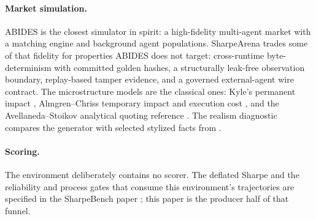 \paragraph{Market simulation.} ABIDES \citep{byrd2020abides} is the closest simulator in spirit: a high-fidelity multi-agent market with a matching engine and background agent populations. SharpeArena trades some of that fidelity for properties ABIDES does not target: cross-runtime byte-determinism with committed golden hashes, a structurally leak-free observation boundary, replay-based tamper evidence, and a governed external-agent wire contract. The microstructure models are the classical ones: Kyle's permanent impact \citep{kyle1985continuous}, Almgren--Chriss temporary impact and execution cost \citep{almgren2001optimal}, and the Avellaneda--Stoikov analytical quoting reference \citep{avellaneda2008high}. The realism diagnostic compares the generator with selected stylized facts from \citet{cont2001empirical}.

\paragraph{Scoring.} The environment deliberately contains no scorer. The deflated Sharpe \citep{bailey2014deflated} and the reliability and process gates that consume this environment's trajectories are specified in the SharpeBench paper \citep{toca2026sharpebench}; this paper is the producer half of that funnel.
